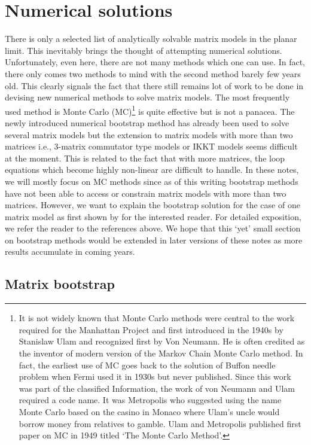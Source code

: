 \documentclass[11pt]{article}
\begin{document}
\section{\label{sec:NSOL}Numerical solutions} 
There is only a selected list of analytically solvable matrix models in the planar limit. This inevitably brings 
the thought of attempting numerical solutions. Unfortunately, even here, there are not many methods 
which one can use. In fact, there only comes two methods to mind with the second method barely few years old. 
This clearly signals the fact that there still remains lot of work to be done in devising new numerical 
methods to solve matrix models. The most frequently used method is Monte Carlo (MC)\footnote{
It is not widely known that Monte Carlo methods were central to the work required for the Manhattan Project
and first introduced in the 1940s by Stanislaw Ulam and recognized first by Von Neumann. 
He is often credited as the inventor of modern version of the Markov Chain Monte Carlo 
method. In fact, the earliest use of MC goes back to the solution of Buffon needle problem when Fermi used it in 1930s but never published. 
Since this work was part of the classified Information, the work of von Neumann and Ulam required a code name. It was Metropolis who 
suggested using the name Monte Carlo based on the casino in 
Monaco where Ulam's uncle would borrow money from relatives to gamble. Ulam and Metropolis
published first paper on MC in 1949 titled `The Monte Carlo Method'.} 
is quite effective but is not a panacea. 
The newly introduced numerical bootstrap method has already been used to solve several matrix models \cite{Anderson:2016rcw,Lin:2020mme,Han:2020bkb,Kazakov:2021lel} but the extension to matrix models with more than two matrices i.e., 3-matrix commutator type models or IKKT models seems difficult at the moment. This is related to the fact that with more matrices, the loop equations which become highly non-linear are difficult to handle.
In these notes, we will mostly focus on MC methods since as of this writing bootstrap methods have not been able to access or constrain matrix models with more than two matrices. However, we want to explain the bootstrap solution for the case of one matrix model as first shown by \cite{Lin:2020mme} for the interested reader. For detailed exposition, we refer the reader to the references above. We hope that this `yet' small section on bootstrap methods would be extended in later versions of these notes as more results accumulate in coming years. 

\subsection{Matrix bootstrap}
\end{document}
